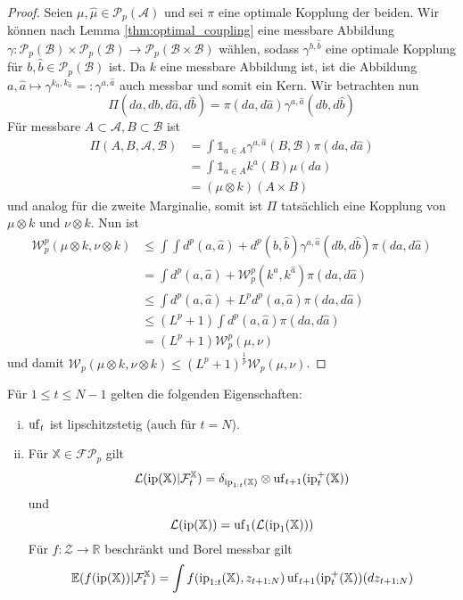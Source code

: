 \begin{proof}
    Seien $\mu, \hat{\mu} \in \mathcal{P}_p(\mathcal{A})$ und sei $\pi$ eine optimale Kopplung der beiden. Wir können nach Lemma \ref{thm:optimal_coupling} eine messbare Abbildung $\gamma: \mathcal{P}_p(\mathcal{B})\times \mathcal{P}_p(\mathcal{B}) \rightarrow \mathcal{P}_p(\mathcal{B}\times \mathcal{B})$ wählen, sodass $\gamma^{b, \hat{b}}$ eine optimale Kopplung für $b,\hat{b} \in \mathcal{P}_p(\mathcal{B})$ ist. Da $k$ eine messbare Abbildung ist, ist die Abbildung $a,\hat{a} \mapsto \gamma^{k_a, k_{\hat{a}}}=:\gamma^{a,\hat{a}}$ auch messbar und somit ein Kern. Wir betrachten nun 
    $$\Pi(da, db, d\hat{a}, d\hat{b}) = \pi(da,d\hat{a}) \gamma^{a,\hat{a}}(db, d\hat{b})$$
    Für messbare $A\subset\mathcal{A}, B\subset \mathcal{B}$ ist 
    \begin{align*}
        \Pi(A, B, \mathcal{A}, \mathcal{B}) &= \int \mathds{1}_{a \in A} \gamma^{a,\hat{a}}(B, \mathcal{B}) \pi(da, d\hat{a}) \\
        &= \int \mathds{1}_{a \in A} k^a(B) \mu(da) \\
        &= (\mu \otimes k)(A\times B)
    \end{align*}
    und analog für die zweite Marginalie, somit ist $\Pi$ tatsächlich eine Kopplung von $\mu \otimes k$ und $\nu \otimes k$. Nun ist
    \begin{align*}
        \mathcal{W}_p^p(\mu \otimes k, \nu \otimes k) &\leq \int \int d^p(a, \hat{a}) + d^p(b, \hat{b}) \gamma^{a, \hat{a}}(db, d\hat{b}) \pi(da, d\hat{a}) \\
        &= \int d^p(a, \hat{a}) + \mathcal{W}_p^p(k^a, k^{\hat{a}})\pi(da, d\hat{a}) \\
        &\leq \int d^p(a, \hat{a}) + L^p d^p(a, \hat{a}) \pi(da, d\hat{a}) \\
        &\leq (L^p+1) \int d^p(a, \hat{a}) \pi(da, d\hat{a}) \\
        &= (L^p+1) \mathcal{W}_p^p(\mu, \nu)
    \end{align*}
    und damit $\mathcal{W}_p(\mu \otimes k, \nu \otimes k) \leq (L^p+1)^\frac{1}{p} \mathcal{W}_p(\mu, \nu)$.
\end{proof}
\begin{lemma}\label{thm:properties_unfold}
Für $1\leq t\leq N-1$ gelten die folgenden Eigenschaften:
\begin{enumerate}[(i)]
\item $\operatorname{uf}_t$ ist lipschitzstetig (auch für $t=N$).
\item Für $\mathbb{X}\in\mathcal{FP}_p$ gilt
\begin{align}
    \mathcal{L}(\operatorname{ip}(\mathbb{X})\vert \mathcal{F}_t^\mathbb{X})=\delta_{\operatorname{ip}_{1:t}(\mathbb{X})}\otimes \operatorname{uf}_{t+1}(\operatorname{ip}_t^+(\mathbb{X}))
\end{align}
und 
$$\mathcal{L}(\operatorname{ip}(\mathbb{X}))=\operatorname{uf}_1(\mathcal{L}(\operatorname{ip}_1(\mathbb{X})))$$
Für $f:\mathcal{Z}\rightarrow \mathbb{R}$ beschränkt und Borel messbar gilt
\begin{align}\label{eq:uf_expected_value}
    \mathbb{E}(f(\operatorname{ip}(\mathbb{X}))\vert \mathcal{F}_t^\mathbb{X}) = \int f(\operatorname{ip}_{1:t}(\mathbb{X}), z_{t+1:N}) \operatorname{uf}_{t+1}(\operatorname{ip}_{t}^+(\mathbb{X}))(dz_{t+1:N})
\end{align}
\end{enumerate}
\end{lemma}
